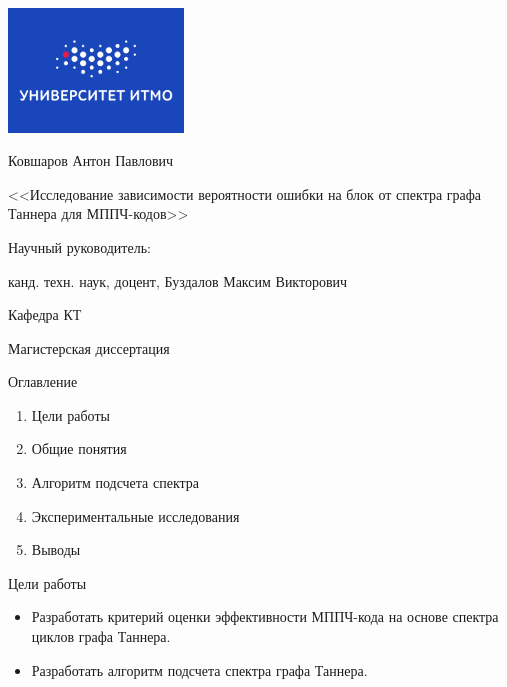 \documentclass[t,13pt,graphics=pdflatex,xcolor=table,aspectratio=43]{beamer}
\begin{document}
\begingroup
{}
\begin{frame}[plain]
\color{white}
\centering\bfseries
\includegraphics[width=0.35\textwidth]{itmo_small_blue_rus.png}

{\Large Ковшаров Антон Павлович \par}

\vspace{0pt plus 0.3filll}

{\large {<<}Исследование зависимости вероятности ошибки на блок от спектра 
            графа Таннера для МППЧ-кодов{>>}}

\vspace{0pt plus 0.3filll}

{\small Научный руководитель:\par
 канд. техн. наук, доцент, Буздалов Максим Викторович}

\vspace{0pt plus 0.3filll}

{\small Кафедра КТ \hfill } 

\vspace{0pt plus 1filll}
\end{frame}
\endgroup

\begin{frame}{Магистерская диссертация}
\begin{block}{Оглавление}
\begin{enumerate}
    \item Цели работы
    \item Общие понятия 
    \item Алгоритм подсчета спектра
    \item Экспериментальные исследования
    \item Выводы
\end{enumerate}
\end{block}
\end{frame}

\begin{frame}{Цели работы}
\begin{itemize}
     \item Разработать критерий оценки эффективности МППЧ-кода на основе спектра циклов графа Таннера.
	\item Разработать алгоритм подсчета спектра графа Таннера.
  \end{itemize}
\end{frame}
\end{document}
